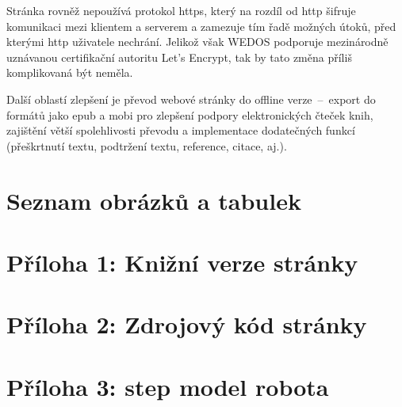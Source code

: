 \documentclass[a4paper, 12pt, twoside]{article}
\makeatletter
\renewcommand\listoffigures{%
    \@mkboth{\MakeUppercase\listfigurename}%
        {\MakeUppercase\listfigurename}%
    \@starttoc{lof}%
}
\renewcommand\listoftables{%
    \@mkboth{\MakeUppercase\listtablename}%
        {\MakeUppercase\listtablename}%
    \@starttoc{lot}%
}
\makeatother
\begin{document}
  Stránka rovněž nepoužívá protokol \gls{https}, který na rozdíl od \gls{http} šifruje komunikaci mezi klientem a serverem a zamezuje tím řadě možných útoků, před kterými \gls{http} uživatele nechrání. Jelikož však WEDOS podporuje mezinárodně uznávanou certifikační autoritu Let's Encrypt, tak by tato změna příliš komplikovaná být neměla.

  Další oblastí zlepšení je převod webové stránky do offline verze~--~export do formátů jako \gls{epub} a \gls{mobi} pro zlepšení podpory elektronických čteček knih, zajištění větší spolehlivosti převodu a implementace dodatečných funkcí (přeškrtnutí textu, podtržení textu, reference, citace, aj.).

  \cleardoublepage

  \printbibliography[heading=bibnumbered, title=Použitá literatura]

  \cleardoublepage

  \section{Seznam obrázků a tabulek}
  \listoffigures%
  \vspace{\baselineskip}
  \listoftables%

  \cleardoublepage

  \section{Příloha 1: Knižní verze stránky} \label{sec:Příloha 1: Knižní verze stránky}

  \newpage

  \section{Příloha 2: Zdrojový kód stránky} \label{sec:Příloha 2: Zdrojový kód stránky}

  \newpage

  \section{Příloha 3: \acrshort{step} model robota} \label{sec:STEP model robota}
\end{document}
